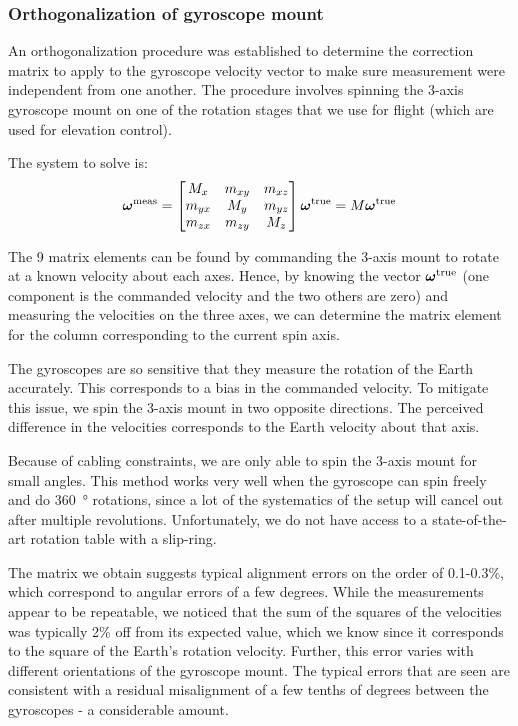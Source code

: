 \subsubsection{Orthogonalization of gyroscope mount}
\label{ap:gyroOrth}

An orthogonalization procedure was established to determine the correction matrix to apply to the gyroscope velocity vector to make sure measurement were independent from one another. The procedure involves spinning the 3-axis gyroscope mount on one of the rotation stages that we use for flight (which are used for elevation control). 

The system to solve is:
\begin{equation}
\boldsymbol\omega^\textrm{meas} = \begin{bmatrix} M_x & m_{xy} & m_{xz} \\   m_{yx} & M_y &m_{yz} \\  m_{zx} & m_{zy} & M_z \end{bmatrix} \boldsymbol\omega^\textrm{true} = M \boldsymbol\omega^\textrm{true} 
\end{equation}

The 9 matrix elements can be found by commanding the 3-axis mount to rotate at a known velocity about each axes. Hence, by knowing the vector $\boldsymbol\omega^\textrm{true}$ (one component is the commanded velocity and the two others are zero) and measuring the velocities on the three axes, we can determine the matrix element for the column corresponding to the current spin axis. 

The gyroscopes are so sensitive that they measure the rotation of the Earth accurately. This corresponds to a bias in the commanded velocity. To mitigate this issue, we spin the 3-axis mount in two opposite directions. The perceived difference in the velocities corresponds to the Earth velocity about that axis. 

Because of cabling constraints, we are only able to spin the 3-axis mount for small angles. This method works very well when the gyroscope can spin freely and do \SI{360}{\degree} rotations, since a lot of the systematics of the setup will cancel out after multiple revolutions. Unfortunately, we do not have access to a state-of-the-art rotation table with a slip-ring.

The matrix we obtain suggests typical alignment errors on the order of 0.1-0.3\%, which correspond to angular errors of a few degrees. While the measurements appear to be repeatable, we noticed that the sum of the squares of the velocities was typically 2\% off from its expected value, which we know since it corresponds to the square of the Earth's rotation velocity. Further, this error varies with different orientations of the gyroscope mount. The typical errors that are seen are consistent with a residual misalignment of a few tenths of degrees between the gyroscopes - a considerable amount.

